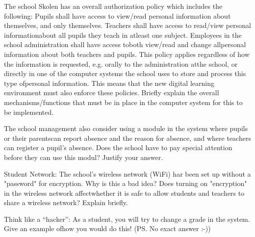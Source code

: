 \documentclass{myassignment}
\begin{document}
	\begin{problem}
		The school Skolen has an overall authorization policy which includes the following:%
			Pupils shall have access to view/read personal information about themselves, and only themselves.%
			Teachers shall have access to read/view personal informationabout all pupils they teach in atleast one subject.%
			Employees in the school administration shall have access toboth view/read and change allpersonal information about both teachers and pupils.%
		This policy applies regardless of how the information is requested, e.g. orally to the administration atthe school, or directly in one of the computer systems the school uses to store and process this type ofpersonal information. This means that the new digital learning environment must also enforce these policies. Briefly explain the overall mechanisms/functions that must be in place in the computer system for this to be implemented.%
	\end{problem}

	\begin{answer}

	\end{answer}

	\begin{problem}
		The school management also consider using a module in the system where pupils or their parentscan report absence and the reason for absence, and where teachers can register a pupil’s absence. Does the school have to pay special attention before they can use this modul? Justify your answer.%
	\end{problem}

	\begin{answer}

	\end{answer}

	\begin{problem}
		Student Network: The school’s wireless network (WiFi) har been set up without a "password" for encryption. Why is this a bad idea? Does turning on "encryption" in the wireless network affectwhether it is safe to allow students and teachers to share a wireless network? Explain briefly.%
	\end{problem}

	\begin{answer}

	\end{answer}

	\begin{problem}
		Think like a ``hacker'': As a student, you will try to change a grade in the system. Give an example ofhow you would do this! (PS. No exact answer :-))%
	\end{problem}

	\begin{answer}

	\end{answer}
\end{document}
